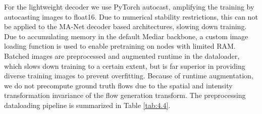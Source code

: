 \begin{table}[ht]
\centering
\footnotesize
\caption{Pretraining Setups}
\label{tab:4.3}
\end{table}

For the lightweight decoder we use PyTorch autocast, amplifying the training by autocasting images to float16. Due to numerical stability restrictions, this can not be applied to the MA-Net decoder based architectures, slowing down training. Due to accumulating memory in the default Mediar backbone, a custom image loading function is used to enable pretraining on nodes with limited RAM. Batched images are preprocessed and augmented runtime in the dataloader, which slows down training to a certain extent, but is far superior in providing diverse training images to prevent overfitting. Because of runtime augmentation, we do not precompute ground truth flows due to the spatial and intensity transformation invariance of the flow generation transform. The preprocessing dataloading pipeline is summarized in Table \ref{tab:4.4}.


